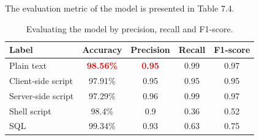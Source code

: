 The evaluation metric of the model is presented in Table 7.4.

\begin{table}[ht]
\centering
	\begin{tabular}{lcccc}
	\hline
	\textbf{Label}     & \textbf{Accuracy} & \textbf{Precision} & \textbf{Recall} & \textbf{F1-score} \\ \hline
	Plain text         & \textcolor{red}{\textbf{98.56\%}}  & \textcolor{red}{\textbf{0.95}}      & 0.99            & 0.97              \\
	Client-side script & 97.91\%           & 0.95               & 0.95            & 0.95              \\
	Server-side script & 97.29\%           & 0.96               & 0.99            & 0.97              \\
	Shell script       & 98.4\%            & 0.9                & 0.36            & 0.52              \\
	SQL                & 99.34\%           & 0.93               & 0.63            & 0.75              \\ \hline
	\end{tabular}
	\caption{\label{demo-table} Evaluating the model by precision, recall and F1-score.}
	\end{table}

